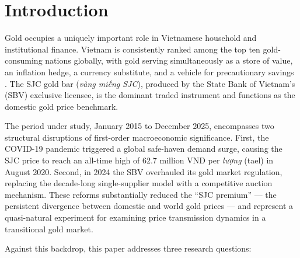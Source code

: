 \documentclass[12pt,a4paper]{article}
\begin{document}
\begin{titlepage}
\begin{abstract}
\medskip
\noindent\textbf{Keywords:} gold price, exchange rate, ARDL bounds test,
ARIMA, Efficient Market Hypothesis, Vietnam, SJC, cointegration,
error correction model

\medskip
\noindent\textbf{JEL Classification:} E31, G11, G14, F31, C22
\end{abstract}
\end{titlepage}

\newpage
\tableofcontents
\newpage

\section{Introduction}

Gold occupies a uniquely important role in Vietnamese household and institutional
finance. Vietnam is consistently ranked among the top ten gold-consuming nations
globally, with gold serving simultaneously as a store of value, an inflation
hedge, a currency substitute, and a vehicle for precautionary savings \citep{worldgoldcouncil2023}.
The SJC gold bar (\textit{vàng miếng SJC}), produced by the State Bank of
Vietnam's (SBV) exclusive licensee, is the dominant traded instrument and
functions as the domestic gold price benchmark.

The period under study, January 2015 to December 2025, encompasses two
structural disruptions of first-order macroeconomic significance.
First, the COVID-19 pandemic triggered a global safe-haven demand surge,
causing the SJC price to reach an all-time high of 62.7 million VND per
\textit{lượng} (tael) in August 2020.
Second, in 2024 the SBV overhauled its gold market regulation,
replacing the decade-long single-supplier model with a competitive auction
mechanism. These reforms substantially reduced the ``SJC premium'' ---
the persistent divergence between domestic and world gold prices ---
and represent a quasi-natural experiment for examining price transmission
dynamics in a transitional gold market.

Against this backdrop, this paper addresses three research questions:
\end{document}
